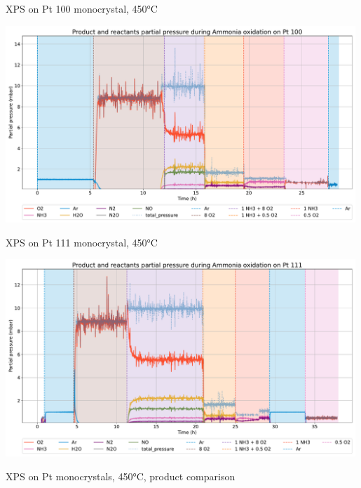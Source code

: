 \begin{frame}{XPS on Pt 100 monocrystal, 450°C}

	\includegraphics[width=0.99\textwidth]{Figures/gas_analysis/XPS/pt_100_total_pressure_norm.pdf}

\end{frame}

\begin{frame}{XPS on Pt 111 monocrystal, 450°C}

	\includegraphics[width=0.99\textwidth]{Figures/gas_analysis/XPS/pt_111_total_pressure_norm.pdf}

\end{frame}

\begin{frame}{XPS on Pt monocrystals, 450°C, product comparison}


\end{frame}